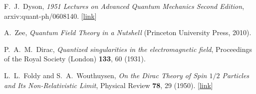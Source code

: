 \documentclass[prx,12pt]{revtex4-2}
\begin{document}
\begin{enumerate}[[1{]}]
\item F.~J.~Dyson, \textit{1951 Lectures on Advanced Quantum Mechanics
  Second Edition}, arxiv:quant-ph/0608140. [\href{https://arxiv.org/abs/quant-ph/0608140}{link}]
\label{cite:dyson}

\item A.~Zee, \textit{Quantum Field Theory in a Nutshell} (Princeton
  University Press, 2010).
\label{cite:zee}

\item P.~A.~M.~Dirac, \textit{Quantized singularities in the electromagnetic field}, Proceedings of the Royal Society (London) \textbf{133}, 60 (1931).
  \label{cite:monopole}

\item L.~L.~Foldy and S.~A.~Wouthuysen, \textit{On the Dirac Theory of
  Spin $1/2$ Particles and Its Non-Relativistic Limit}, Physical
  Review \textbf{78}, 29 (1950). [\href{https://journals.aps.org/pr/abstract/10.1103/PhysRev.78.29}{link}]
\label{cite:foldy}
\end{enumerate}
\end{document}

